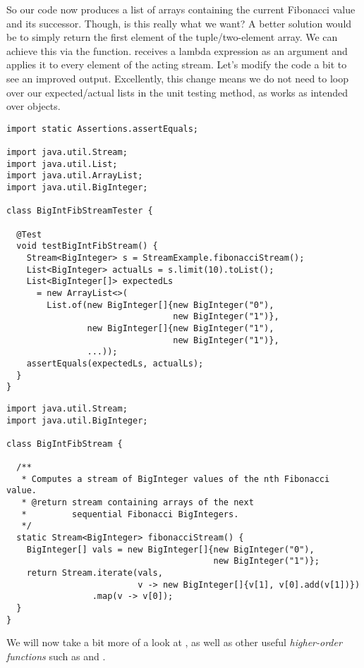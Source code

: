 So our code now produces a list of  arrays containing the current Fibonacci value and its successor. Though, is this really what we want? A better solution would be to simply return the first element of the tuple/two-element array. We can achieve this via the  function.  receives a lambda expression as an argument and applies it to every element of the acting stream. Let's modify the code a bit to see an improved output. Excellently, this change means we do not need to loop over our expected/actual lists in the unit testing method, as  works as intended over  objects.

\begin{lstlisting}[language=MyJava]
import static Assertions.assertEquals;

import java.util.Stream;
import java.util.List;
import java.util.ArrayList;
import java.util.BigInteger;

class BigIntFibStreamTester {

  @Test
  void testBigIntFibStream() {
    Stream<BigInteger> s = StreamExample.fibonacciStream();
    List<BigInteger> actualLs = s.limit(10).toList();
    List<BigInteger[]> expectedLs 
      = new ArrayList<>(
        List.of(new BigInteger[]{new BigInteger("0"), 
                                 new BigInteger("1")},
                new BigInteger[]{new BigInteger("1"), 
                                 new BigInteger("1")},
                ...));
    assertEquals(expectedLs, actualLs);
  }
}
\end{lstlisting}

\begin{lstlisting}[language=MyJava]
import java.util.Stream;
import java.util.BigInteger;

class BigIntFibStream {

  /**
   * Computes a stream of BigInteger values of the nth Fibonacci value.
   * @return stream containing arrays of the next 
   *         sequential Fibonacci BigIntegers.
   */
  static Stream<BigInteger> fibonacciStream() {
    BigInteger[] vals = new BigInteger[]{new BigInteger("0"),
                                         new BigInteger("1")};
    return Stream.iterate(vals, 
                          v -> new BigInteger[]{v[1], v[0].add(v[1])})
                 .map(v -> v[0]);
  }
}
\end{lstlisting}

We will now take a bit more of a look at , as well as other useful \emph{higher-order functions} such as  and .

